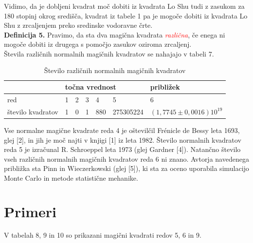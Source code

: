 \documentclass[a4paper,12pt]{article}
\begin{document}
Vidimo, da je dobljeni kvadrat moč dobiti iz kvadrata Lo Shu tudi z zasukom za
180 stopinj okrog središča, kvadrat iz tabele 1 pa je mogoče dobiti
iz kvadrata Lo Shu z zrcaljenjem preko sredinske vodoravne črte.
\\[1em]


      \textbf{Definicija 5.} Pravimo, da sta dva magična kvadrata \textcolor{red}{\emph{različna}}, če enega ni mogoče dobiti
      iz drugega s pomočjo zasukov oziroma zrcaljenj.
\\[1em]
Števila različnih normalnih magičnih kvadratov se nahajajo v tabeli 7.

\begin{table}[H]
   \label{table:stevila}
   \caption{Število različnih normalnih magičnih kvadratov}
   \begin{tabular}{lllllll}
   \hline
    & \multicolumn{5}{l}{točna vrednost} & približek \\ \hline
    red & 1 & 2 & 3 & 4 & 5 & 6  \\
    število kvadratov & 1 & 0 & 1 & 880 & 275305224 & $\left( 1,7745 \pm 0,0016 \right) 10^{19}$ \\ \hline  
   \end{tabular}
   \end{table}

Vse normalne magične kvadrate reda 4 je oštevilčil Frénicle de Bessy
leta 1693, glej [2], in jih je moč najti v knjigi [1]
iz leta 1982. Število normalnih kvadratov reda 5 je izračunal
R. Schroeppel leta 1973 (glej Gardner [4]).
Natančno število vseh različnih normalnih magičnih kvadratov reda 6 ni znano.
Avtorja navedenega približka sta Pinn in Wieczerkowski (glej [5]), ki
sta za oceno uporabila simulacijo Monte Carlo in metode statistične mehanike.


\section{Primeri}

V tabelah 8, 9 in 10 so prikazani
magični kvadrati redov 5, 6 in 9.
\end{document}
